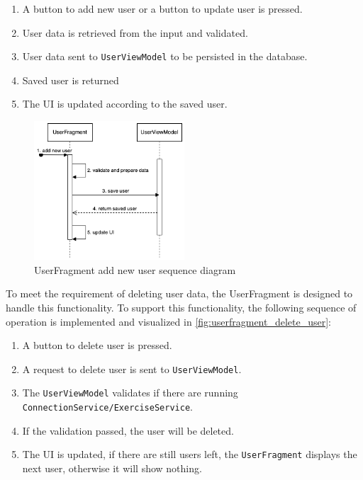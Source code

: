 \begin{enumerate}
    \item A button to add new user or a button to update user is pressed.
    \item User data is retrieved from the input and validated.
    \item User data sent to \texttt{UserViewModel} to be persisted in the database.
    \item Saved user is returned
    \item The UI is updated according to the saved user.
\end{enumerate}

\begin{figure}[H]
    \centering
    \includegraphics[width=0.5\textwidth]{diagrams/create-user-seq.drawio.png}
    \caption{UserFragment add new user sequence diagram}
    \label{fig:userfragment_add_new_user}
\end{figure}

To meet the requirement of deleting user data, the UserFragment is designed to handle this functionality. 
To support this functionality, the following sequence of operation is implemented and visualized in \autoref{fig:userfragment_delete_user}:

\begin{enumerate}
    \item A button to delete user is pressed.
    \item A request to delete user is sent to \texttt{UserViewModel}.
    \item The \texttt{UserViewModel} validates if there are running \texttt{ConnectionService/ExerciseService}.
    \item If the validation passed, the user will be deleted.
    \item The UI is updated, if there are still users left, the \texttt{UserFragment} displays the next user, otherwise it will show nothing.
\end{enumerate}

